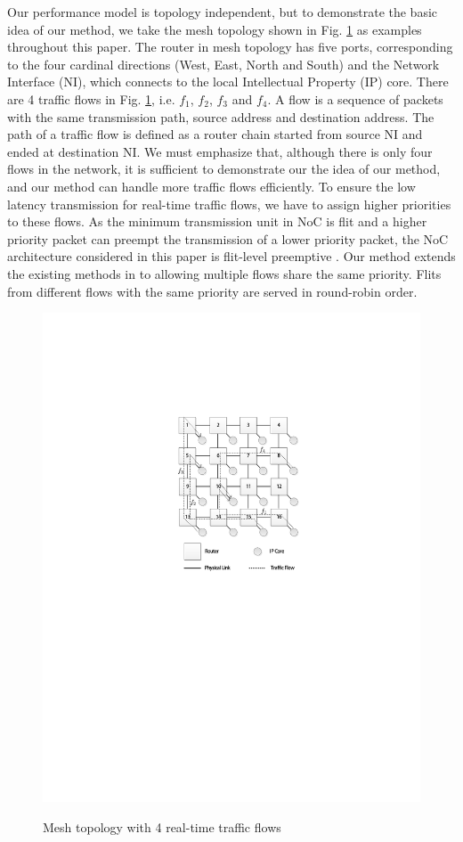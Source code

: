\documentclass[10pt,journal]{IEEEtran}
\begin{document}
Our performance model is topology independent, but to demonstrate the basic idea of our method, we take the mesh topology shown in Fig. \ref{topology} as examples throughout this paper. The router in mesh topology has five ports, corresponding to the four cardinal directions (West, East, North and South) and the Network Interface (NI), which connects to the local Intellectual Property (IP) core. There are 4 traffic flows in Fig. \ref{topology}, i.e. $f_1$, $f_2$, $f_3$ and $f_4$. A flow is a sequence of packets with the same transmission path, source address and destination address. The path of a traffic flow is defined as a router chain started from source NI and ended at destination NI. We must emphasize that, although there is only four flows in the network, it is sufficient to demonstrate our the idea of our method, and our method can handle more traffic flows efficiently. To ensure the low latency transmission for real-time traffic flows, we have to assign higher priorities to these flows. As the minimum transmission unit in NoC is flit and a higher priority packet can preempt the transmission of a lower priority packet, the NoC architecture considered in this paper is flit-level preemptive \cite{Lee:2003:RWC:846077.846083}. Our method extends the existing methods in \cite{73}\cite{Qian489900} to allowing multiple flows share the same priority. Flits from different flows with the same priority are served in round-robin order.
\begin{figure}
  \centering
  \includegraphics[scale=0.9]{figures/mesh.pdf}\\
  \caption{Mesh topology with 4 real-time traffic flows}\label{topology}
\end{figure}
\end{document}
